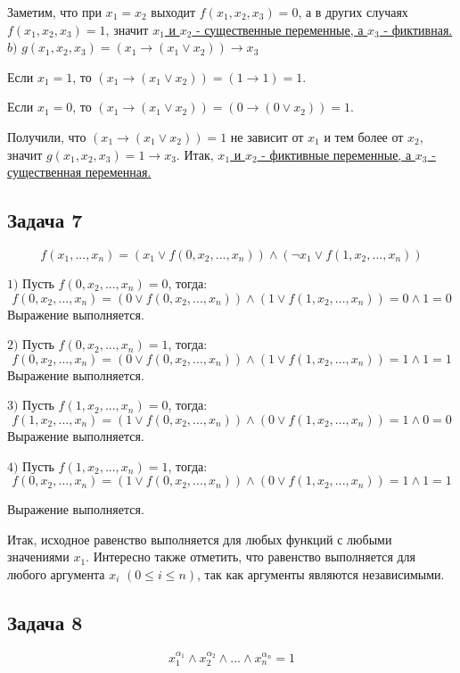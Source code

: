 \documentclass[a4paper,14pt]{article} %
\begin{document}
Заметим, что при $x_1=x_2$ выходит $f(x_1,x_2,x_3)=0$, а в других случаях $f(x_1,x_2,x_3)=1$, значит \underline{$x_1$ и $x_2$ - существенные переменные, а $x_3$ - фиктивная.} \\

$b)$ $g(x_1,x_2,x_3)=(x_1\rightarrow (x_1\vee x_2))\rightarrow x_3$

Если $x_1=1$, то $(x_1\rightarrow (x_1\vee x_2))=(1\rightarrow 1)=1$.

Если $x_1=0$, то $(x_1\rightarrow (x_1\vee x_2))=(0\rightarrow (0\vee x_2))=1$.

Получили, что $(x_1\rightarrow (x_1\vee x_2))=1$ не зависит от $x_1$ и тем более от $x_2$, значит $g(x_1,x_2,x_3)=1\rightarrow x_3$.
Итак, \underline{$x_1$ и $x_2$ - фиктивные переменные, а $x_3$ - существенная переменная.}

\newpage
\begin{center}
\subsection{Задача 7}
\end{center}
\[f(x_1,...,x_n)=(x_1\vee f(0,x_2,...,x_n))\wedge (\neg x_1 \vee f(1,x_2,...,x_n))\]

$1)$ Пусть $f(0,x_2,...,x_n)=0$, тогда:
\[f(0,x_2,...,x_n)=(0\vee f(0,x_2,...,x_n))\wedge (1 \vee f(1,x_2,...,x_n))=0\wedge 1 =0\]
Выражение выполняется.

$2)$ Пусть $f(0,x_2,...,x_n)=1$, тогда:
\[f(0,x_2,...,x_n)=(0\vee f(0,x_2,...,x_n))\wedge (1 \vee f(1,x_2,...,x_n))=1\wedge 1 =1\]
Выражение выполняется.

$3)$ Пусть $f(1,x_2,...,x_n)=0$, тогда:
\[f(1,x_2,...,x_n)=(1\vee f(0,x_2,...,x_n))\wedge (0 \vee f(1,x_2,...,x_n))=1\wedge 0 =0\]
Выражение выполняется.

$4)$ Пусть $f(1,x_2,...,x_n)=1$, тогда:
\[f(0,x_2,...,x_n)=(1\vee f(0,x_2,...,x_n))\wedge (0 \vee f(1,x_2,...,x_n))=1\wedge 1 =1\]

Выражение выполняется.

Итак, исходное равенство выполняется для любых функций с любыми значениями $x_1$. Интересно также отметить, что равенство выполняется для любого аргумента $x_i$ $(0\leqslant i\leqslant n)$, так как аргументы являются независимыми.

\newpage
\begin{center}
\subsection{Задача 8}
\end{center}
\[x_1^{\alpha_1}\wedge x_2^{\alpha_2} \wedge ... \wedge x_n^{\alpha_n}=1\]
\end{document}
